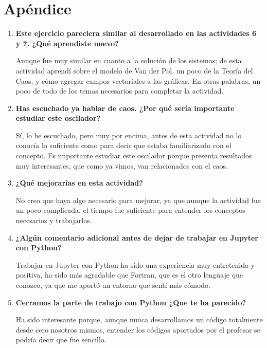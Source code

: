 \documentclass[a4paper]{article}
\begin{document}
\section{Apéndice}
\begin{enumerate}
\item \textbf{Este ejercicio pareciera similar al desarrollado en las actividades 6 y 7. ¿Qué aprendiste nuevo?}

Aunque fue muy similar en cuanto a la solución de los sistemas; de esta actividad aprendí sobre el modelo de Van der Pol, un poco de la Teoría del Caos, y cómo agregar campos vectoriales a las gráficas. En otras palabras, un poco de todo de los temas necesarios para completar la actividad.

\item \textbf{Has escuchado ya hablar de caos. ¿Por qué sería importante estudiar este oscilador?}

Sí, lo he escuchado, pero muy por encima, antes de esta actividad no lo conocía lo suficiente como para decir que estaba familiarizado con el concepto. Es importante estudiar este oscilador porque presenta resultados muy interesantes, que como ya vimos, van relacionados con el caos.

\item \textbf{¿Qué mejorarías en esta actividad?}

No creo que haya algo necesario para mejorar, ya que aunque la actividad fue un poco complicada, el tiempo fue suficiente para entender los conceptos necesarios y trabajarlos.

\item \textbf{¿Algún comentario adicional antes de dejar de trabajar en Jupyter con Python?}

Trabajar en Jupyter con Python ha sido una experiencia muy entretenida y positiva, ha sido más agradable que Fortran, que es el otro lenguaje que conozco, ya que me aportó un entorno que sentí más cómodo. 

\item \textbf{Cerramos la parte de trabajo con Python ¿Que te ha parecido?}

Ha sido interesante porque, aunque nunca desarrollamos un código totalmente desde cero nosotros mismos, entender los códigos aportados por el profesor se podría decir que fue sencillo. 
\end{enumerate}
\end{document}
